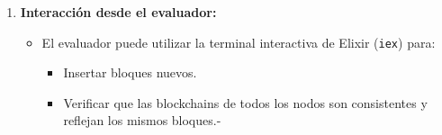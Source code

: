 {{\begin{enumerate}
        \item \textbf{Interacción desde el evaluador:}
        \begin{itemize}
            \item El evaluador puede utilizar la terminal interactiva de Elixir (\texttt{iex}) para:
            \begin{itemize}
                \item Insertar bloques nuevos.
                \item Verificar que las blockchains de todos los nodos son consistentes y reflejan los mismos bloques.-
            \end{itemize}
        \end{itemize}
    \end{enumerate}
}}